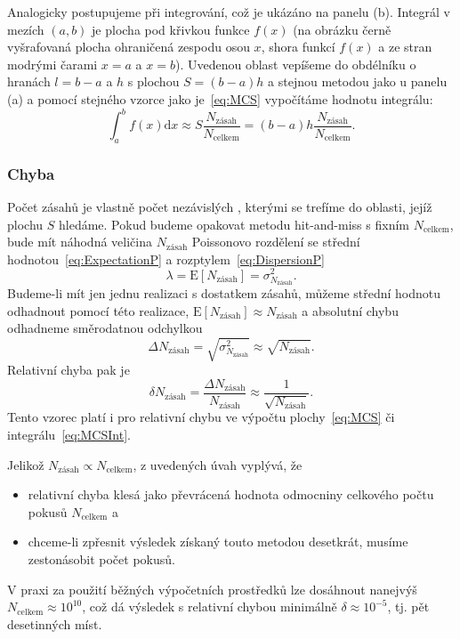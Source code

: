 \documentclass[a4paper,11pt,twoside]{article}
\renewcommand{\d}{\mathrm{d}}           %
\def\expectation#1{\mathrm{E}\left[#1\right]}
\def\dispersion#1{\sigma_{#1}^{2}}
\theoremstyle{red}
\theoremstyle{green}
\begin{document}
        Analogicky postupujeme při integrování, což je ukázáno na panelu (b).
        Integrál v mezích $(a,b)$ je plocha pod křivkou funkce $f(x)$  (na obrázku černě vyšrafovaná plocha ohraničená zespodu osou $x$, shora funkcí $f(x)$ a ze stran modrými čarami $x=a$ a $x=b$).
        Uvedenou oblast vepíšeme do obdélníku o hranách $l=b-a$ a $h$ s plochou $S=(b-a)h$ a stejnou metodou jako u panelu (a) a pomocí stejného vzorce jako je~\eqref{eq:MCS} vypočítáme hodnotu integrálu:
        \begin{equation}
            \label{eq:MCSInt}
            \int_{a}^{b}f(x)\d x\approx S\frac{N_{\text{zásah}}}{N_{\text{celkem}}}=(b-a)h\frac{N_{\text{zásah}}}{N_{\text{celkem}}}.
        \end{equation}

        \subsubsection{Chyba}
            Počet zásahů je vlastně počet nezávislých , kterými se trefíme do oblasti, jejíž plochu $S$ hledáme.
            Pokud budeme opakovat metodu hit-and-miss s fixním $N_{\text{celkem}}$, bude mít náhodná veličina $N_{\text{zásah}}$ Poissonovo rozdělení se střední hodnotou~\eqref{eq:ExpectationP} a rozptylem~\eqref{eq:DispersionP}
            \begin{equation}
                \lambda=\expectation{N_{\text{zásah}}}=\dispersion{N_{\text{zásah}}}.
            \end{equation}
            Budeme-li mít jen jednu realizaci s dostatkem zásahů, můžeme střední hodnotu odhadnout pomocí této realizace, $\expectation{N_{\text{zásah}}}\approx N_{\text{zásah}}$ a absolutní chybu odhadneme směrodatnou odchylkou
            \begin{equation}
                \Delta N_{\text{zásah}}=\sqrt{\dispersion{N_\text{zásah}}}\approx\sqrt{N_{\text{zásah}}}.
            \end{equation}
            Relativní chyba pak je
            \begin{equation}
                \label{eq:MCRelative}
                \delta N_{\text{zásah}}=\frac{\Delta N_{\text{zásah}}}{N_{\text{zásah}}}\approx\frac{1}{\sqrt{N_{\text{zásah}}}}.
            \end{equation}
            Tento vzorec platí i pro relativní chybu ve výpočtu plochy~\eqref{eq:MCS} či integrálu~\eqref{eq:MCSInt}.

            Jelikož $N_{\text{zásah}}\propto N_{\text{celkem}}$, z uvedených úvah vyplývá, že
            \begin{itemize}
                \item relativní chyba klesá jako převrácená hodnota odmocniny celkového počtu pokusů $N_{\text{celkem}}$ a
                \item chceme-li zpřesnit výsledek získaný touto metodou desetkrát, musíme zestonásobit počet pokusů.
            \end{itemize}
            V praxi za použití běžných výpočetních prostředků lze dosáhnout nanejvýš $N_{\text{celkem}}\approx10^{10}$, což dá výsledek s relativní chybou minimálně $\delta\approx10^{-5}$, tj. pět desetinných míst.
\end{document}
